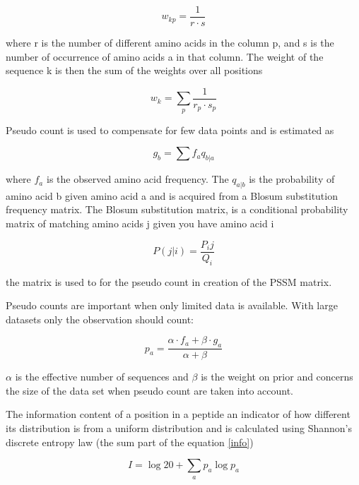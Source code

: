 \begin{equation}
w_{kp} = \frac{1}{r\cdot s}
\end{equation}

where r is the number of different amino acids in the column p, and s is the number of occurrence of amino acids a in that column. The weight of the sequence k is then the sum of the weights over all positions

\begin{equation}
w_{k} = \sum_{p}{\frac{1}{r_p \cdot s_p}}
\end{equation}

Pseudo count is used to compensate for few data points and is estimated as

\begin{equation}
g_b = \sum{f_a}{q_{b|a}}
\end{equation}

where $f_a$ is the observed amino acid frequency. The $q_{a|b}$ is the probability of amino acid b given amino acid a and is acquired from a Blosum substitution frequency matrix.
The Blosum substitution matrix, is a
conditional probability matrix of matching amino
acids j given you have amino acid i

\begin{equation}
P(j|i) = \frac{P_ij}{Q_i}
\end{equation}

the matrix is used to for the pseudo count in creation of the PSSM matrix. 

Pseudo counts are important when only limited data is available. With large datasets only the observation should count:

\begin{equation}
p_a = \frac{\alpha \cdot f_a + \beta \cdot g_a}{\alpha + \beta}
\end{equation}

$\alpha$ is the effective number of sequences and $\beta$ is the weight on prior and concerns the size of the data set when pseudo count are taken into account.

The information content of a position in a peptide an indicator of how different its distribution is from a uniform distribution and is calculated using Shannon's discrete entropy law (the sum part of the equation \ref{info})

\begin{equation}
\label{info}
I = \log{ 20 } + \sum_{a}{ p_{a}\log{p_{a}} }
\end{equation}

